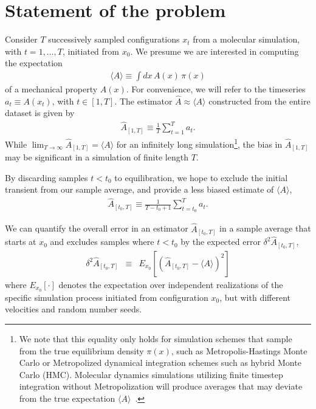 \documentclass[aps,pre,twocolumn,nofootinbib,superscriptaddress,linenumbers,11point]{revtex4-1}
\newcommand{\expect}[1]{\langle #1 \rangle}                %
\begin{document}
\section*{Statement of the problem}

Consider $T$ successively sampled configurations $x_t$ from a molecular simulation, with $t = 1, \ldots, T$, initiated from $x_0$.
We presume we are interested in computing the expectation
\begin{eqnarray}
\expect{A} \equiv \int dx \, A(x) \, \pi(x)
\end{eqnarray}
of a mechanical property $A(x)$.
For convenience, we will refer to the timeseries $a_t \equiv A(x_t)$, with $t \in [1,T]$.
The estimator $\hat{A} \approx \expect{A}$ constructed from the entire dataset is given by
\begin{eqnarray}
\hat{A}_{[1,T]} \equiv \frac{1}{T} \sum_{t=1}^T a_t . \label{equation:time-average}
\end{eqnarray}
While $\lim_{T \rightarrow \infty} \hat{A}_{[1,T]} = \expect{A}$ for an infinitely long simulation\footnote{We note that this equality only holds for simulation schemes that sample from the true equilibrium density $\pi(x)$, such as Metropolis-Hastings Monte Carlo or Metropolized dynamical integration schemes such as hybrid Monte Carlo (HMC). Molecular dynamics simulations utilizing finite timestep integration without Metropolization will produce averages that may deviate from the true expectation $\expect{A}$~\cite{sivak:2013:prx:vvvr}.}, the bias in $\hat{A}_{[1,T]}$ may be significant in a simulation of finite length $T$.

By discarding samples $t < t_0$ to equilibration, we hope to exclude the initial transient from our sample average, and provide a less biased estimate of $\expect{A}$,
\begin{eqnarray}
\hat{A}_{[t_0,T]} \equiv \frac{1}{T-t_0+1} \sum_{t=t_0}^T a_t . \label{equation:production-time-average} 
\end{eqnarray}

We can quantify the overall error in an estimator $\hat{A}_{[t_0,T]}$ in a sample average that starts at $x_0$ and excludes samples where $t < t_0$ by the expected error $\delta^2 \hat{A}_{[t_0,T]}$,
\begin{eqnarray}
\delta^2 \hat{A}_{[t_0,T]} &\equiv& E_{x_0} \left[ \left( \hat{A}_{[t_0,T]} - \expect{A} \right)^2 \right] \label{equation:rms-error} 
\end{eqnarray}
where $E_{x_0}[\cdot]$ denotes the expectation over independent realizations of the specific simulation process initiated from configuration $x_0$, but with different velocities and random number seeds.
\end{document}

